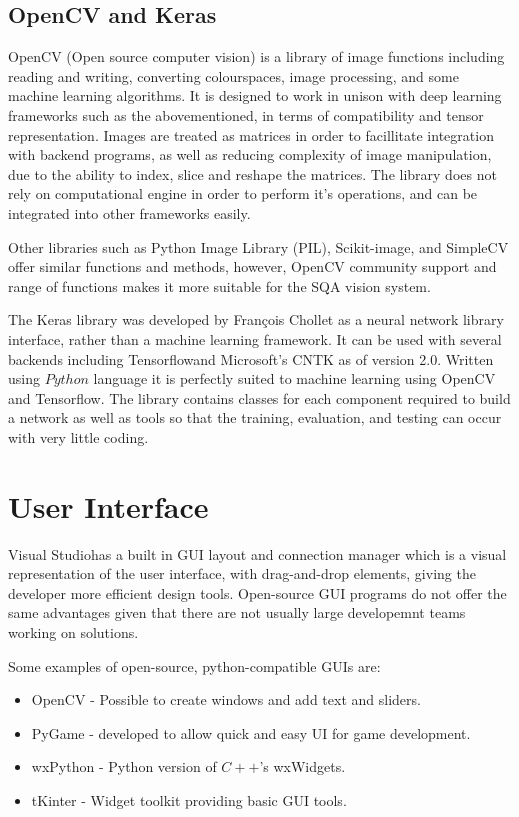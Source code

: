 \documentclass[fleqn,twoside,12pt]{report}
\begin{document}
\subsection{OpenCV and Keras}

OpenCV (Open source computer vision) is a library of image functions including reading and writing, converting colourspaces, image processing, and some machine learning algorithms. It is designed to work in unison with deep learning frameworks such as the abovementioned, in terms of compatibility and tensor representation. Images are treated as matrices in order to facillitate integration with backend programs, as well as reducing complexity of image manipulation, due to the ability to index, slice and reshape the matrices. The library does not rely on computational engine in order to perform it's operations, and can be integrated into other frameworks easily.

Other libraries such as Python Image Library (PIL), Scikit-image, and SimpleCV offer similar functions and methods, however, OpenCV community support and range of functions makes it more suitable for the SQA vision system.

The Keras library was developed by François Chollet as a neural network library interface, rather than a machine learning framework. It can be used with several backends including Tensorflow\textregistered and Microsoft\textregistered's CNTK as of version 2.0. Written using $Python$ language it is perfectly suited to machine learning using OpenCV and Tensorflow\textregistered. The library contains classes for each component required to build a network as well as tools so that the training, evaluation, and testing can occur with very little coding.

\section{User Interface}


Visual Studio\textregistered has a built in GUI layout and connection manager which is a visual representation of the user interface, with drag-and-drop elements, giving the developer more efficient design tools. Open-source GUI programs do not offer the same advantages given that there are not usually large developemnt teams working on solutions. 

Some examples of open-source, python-compatible GUIs are:

\begin{itemize}
	\item OpenCV - Possible to create windows and add text and sliders.
	\item PyGame - developed to allow quick and easy UI for game development.
	\item wxPython - Python version of $C++$'s wxWidgets.
	\item tKinter - Widget toolkit providing basic GUI tools.
\end{itemize}
\end{document}

